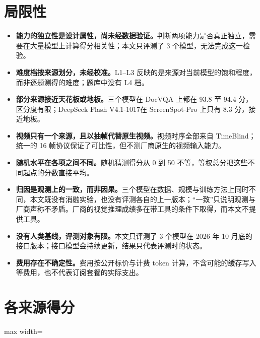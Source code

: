 \documentclass[11pt,a4paper,fontset=none]{ctexart}
\newcommand{\ds}{DeepSeek Flash V4.1-1017}
\newcommand{\lead}[1]{\textbf{#1}\quad}
\begin{document}
\section*{局限性}

\begin{itemize}[leftmargin=1.6em]
  \item \lead{能力的独立性是设计属性，尚未经数据验证。}判断两项能力是否真正独立，需要在大量模型上计算得分相关性；本文只评测了 3 个模型，无法完成这一检验。
  \item \lead{难度档按来源划分，未经校准。}L1--L3 反映的是来源对当前模型的饱和程度，而非逐题测得的难度；题库中没有 L4 档。
  \item \lead{部分来源接近天花板或地板。}三个模型在 DocVQA 上都在 93.8 至 94.4 分，区分度有限；\ds 在 ScreenSpot-Pro 上只有 8.3 分，接近地板。
  \item \lead{视频只有一个来源，且以抽帧代替原生视频。}视频时序全部来自 TimeBlind；统一的 16 帧协议保证了可比性，但不测厂商原生的视频输入能力。
  \item \lead{随机水平在各项之间不同。}随机猜测得分从 0 到 50 不等，等权总分把这些不同起点的分数直接平均。
  \item \lead{归因是观测上的一致，而非因果。}三个模型在数据、规模与训练方法上同时不同，本文既没有消融实验，也没有评测各自的上一版本；“一致”只说明观测与厂商声称不矛盾。厂商的视觉推理成绩多在带工具的条件下取得，而本文不提供工具。
  \item \lead{没有人类基线，评测对象有限。}本文只评测了 3 个模型在 2026 年 10 月底的接口版本；接口模型会持续更新，结果只代表评测时的状态。
  \item \lead{费用存在不确定性。}费用按公开标价与计费 token 计算，不含可能的缓存写入等费用，也不代表订阅套餐的实际支出。
\end{itemize}




\appendix
\section{各来源得分}
\label{app:source}

\begin{table}[H]
  \centering
  \caption{\textbf{各来源子集上的得分（$\uparrow$）。}每行最高分加粗，次高分加下划线；“随机”为随机猜测的期望得分。各来源只是抽样子集，得分不等于该评测集的完整成绩，也不能与其官方榜单直接比较。}
  \label{tab:source}
  \small
  \begin{adjustbox}{max width=\linewidth}\end{adjustbox}
\end{table}
\end{document}
